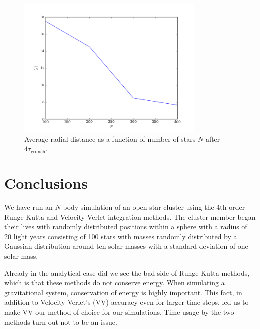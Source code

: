\documentclass{article}
\begin{document}
\begin{multicols}{2}
\begin{figure}
\begin{center}
  	\includegraphics[width=90mm]{Images/avg_dist.png}
\caption{Average radial distance as a function of number of stars $N$ after $4 \tau_{\mathrm{crunch}}$.}\label{fig:Nbody_avg_dist}
\end{center}
\end{figure}



%
%






\section{Conclusions}\label{sec:conclusion}

We have run an $N$-body simulation of an open star cluster using the 4th order Runge-Kutta and Velocity Verlet integration methods. The cluster member began their lives with randomly distributed positions within a sphere with a radius of 20 light years consisting of 100 stars with masses randomly distributed by a Gaussian distribution around ten solar masses with a standard deviation of one solar mass.

Already in the analytical case did we see the bad side of Runge-Kutta methods, which is that these methods do not conserve energy. When simulating a gravitational system, conservation of energy is highly important. This fact, in addition to Velocity Verlet's (VV) accuracy even for larger time steps, led us to make VV our method of choice for our simulations. Time usage by the two methods turn out not to be an issue.


\end{multicols}
\end{document}
